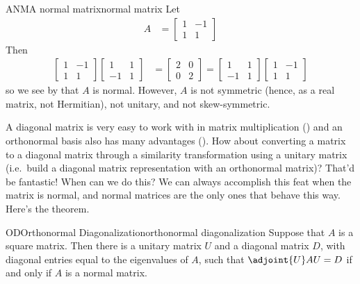 %
\begin{example}{ANM}{A normal matrix}{normal matrix}
Let
%
\begin{align*}
A&=
\begin{bmatrix}
1 & -1\\1 & 1
\end{bmatrix}
\end{align*}
%
Then
%
\begin{align*}
%
\begin{bmatrix}
1 & -1\\1 & 1
\end{bmatrix}
\begin{bmatrix}
1 & 1\\-1 & 1
\end{bmatrix}
&=
\begin{bmatrix}
2 & 0\\0 & 2
\end{bmatrix}
=
\begin{bmatrix}
1 & 1\\-1 & 1
\end{bmatrix}
\begin{bmatrix}
1 & -1\\1 & 1
\end{bmatrix}
%
\end{align*}
%
so we see by  that $A$ is normal.  However, $A$ is not symmetric (hence, as a real matrix, not Hermitian), not unitary, and not skew-symmetric.
\end{example}
%
%
A diagonal matrix is very easy to work with in matrix multiplication () and an orthonormal basis also has many advantages ().  How about converting a matrix to a diagonal matrix through a similarity transformation using a unitary matrix (i.e.\ build a diagonal matrix representation with an orthonormal matrix)?  That'd be fantastic!  When can we do this?  We can always accomplish this feat when the matrix is normal, and normal matrices are the only ones that behave this way.  Here's the theorem.
%
\begin{theorem}{OD}{Orthonormal Diagonalization}{orthonormal diagonalization}
Suppose that $A$ is a square matrix.   Then there is a unitary matrix $U$ and a diagonal matrix $D$, with diagonal entries equal to the eigenvalues of $A$, such that $\adjoint{U}AU=D$ if and only if $A$ is a normal matrix.  
\end{theorem}
%
